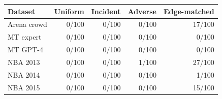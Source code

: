 \begin{tabular}{lrrrr}
\toprule
Dataset & Uniform & Incident & Adverse & Edge-matched \\
\midrule
Arena crowd & 0/100 & 0/100 & 0/100 & 17/100 \\
MT expert & 0/100 & 0/100 & 0/100 & 0/100 \\
MT GPT-4 & 0/100 & 0/100 & 0/100 & 0/100 \\
NBA 2013 & 0/100 & 0/100 & 1/100 & 27/100 \\
NBA 2014 & 0/100 & 0/100 & 0/100 & 1/100 \\
NBA 2015 & 0/100 & 0/100 & 0/100 & 15/100 \\
\bottomrule
\end{tabular}
